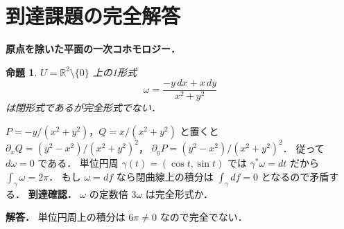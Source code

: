 \documentclass[a5paper,10pt,onecolumn]{jsarticle}
\makeatletter
\theoremstyle{mathnotetheorem}
\newtheorem{proposition}[theorem]{命題}
\renewcommand{\proofname}{証明}
\renewenvironment{proof}[1][\proofname]{%
  \par\pushQED{\qed}\normalfont\topsep4\p@\@plus2\p@\relax
  \trivlist\item[\hskip\labelsep\bfseries #1]\ignorespaces
}{\popQED\endtrivlist\@endpefalse}
\makeatother
\begin{document}
\section{到達課題の完全解答}
\noindent\textbf{原点を除いた平面の一次コホモロジー．}
\begin{proposition}
$U=\mathbb R^2\setminus\{0\}$ 上の1形式
\[
\omega=\frac{-y\,dx+x\,dy}{x^2+y^2}
\]
は閉形式であるが完全形式でない．
\end{proposition}
\begin{proof}
$P=-y/(x^2+y^2)$，$Q=x/(x^2+y^2)$ と置くと
$\partial_xQ=(y^2-x^2)/(x^2+y^2)^2$，
$\partial_yP=(y^2-x^2)/(x^2+y^2)^2$．
従って $d\omega=0$ である．
単位円周 $\gamma(t)=(\cos t,\sin t)$ では
$\gamma^*\omega=dt$ だから
$\int_\gamma\omega=2\pi$．
もし $\omega=df$ なら閉曲線上の積分は
$\int_\gamma df=0$ となるので矛盾する．
\end{proof}
\noindent\textbf{到達確認．}
$\omega$ の定数倍 $3\omega$ は完全形式か．
\par\noindent\textbf{解答．}
単位円周上の積分は $6\pi\ne0$ なので完全でない．
\end{document}
